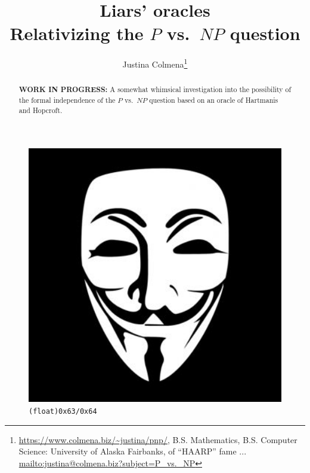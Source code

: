 \documentclass[letterpaper]{article}
\title{\textbf{Liars' oracles}\\ Relativizing the $P$ vs.\ $NP$ question}
\author{Justina Colmena\footnote{\url{https://www.colmena.biz/~justina/pnp/}, B.S. Mathematics, B.S. Computer Science: University of Alaska Fairbanks, of ``HAARP'' fame \cite[etc.]{haarp,haarp.net,begich2002angels,burks2010haarp,want2016haarp,smith1998haarp,freeland2014chemtrails} ... \url{mailto:justina@colmena.biz?subject=P_vs._NP}}}
\begin{document}
\sloppy
{}\maketitle
{}
\begin{abstract} {\color{red}\textbf{WORK IN PROGRESS:}}
A somewhat whimsical investigation into the possibility of the formal independence of the $P$ vs.\ $NP$ question based on an oracle of Hartmanis and Hopcroft.
\end{abstract}
\begin{figure}
	\includegraphics[width=1.0\textwidth]{guy_fawkes_mask.jpg}
	\caption[\texttt{(float)0x63/0x64}]{\texttt{(float)0x63/0x64} \cite{anon2012}}
\end{figure}

\tableofcontents

\listoffigures

\listofalgorithms

\listofGrammars
\end{document}
